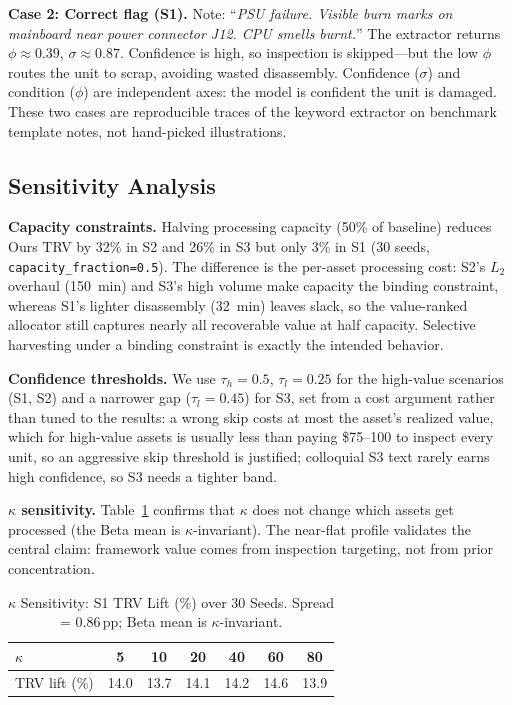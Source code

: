 \documentclass[conference]{IEEEtran}
\begin{document}
\smallskip\noindent\textbf{Case 2: Correct flag (S1).}
Note: ``\textit{PSU failure. Visible burn marks on mainboard near power connector
J12. CPU smells burnt.}'' The extractor returns $\phi{\approx}0.39$,
$\sigma{\approx}0.87$. Confidence is high, so inspection is skipped---but the low
$\phi$ routes the unit to scrap, avoiding wasted disassembly. Confidence
($\sigma$) and condition ($\phi$) are independent axes: the model is confident the
unit is damaged. These two cases are reproducible traces of the keyword extractor
on benchmark template notes, not hand-picked illustrations.

\subsection{Sensitivity Analysis}

\noindent\textbf{Capacity constraints.}
Halving processing capacity (50\% of baseline) reduces Ours TRV by 32\% in S2 and
26\% in S3 but only 3\% in S1 (30 seeds, \texttt{capacity\_fraction=0.5}). The
difference is the per-asset processing cost: S2's $L_2$ overhaul (150~min) and
S3's high volume make capacity the binding constraint, whereas S1's lighter
disassembly (32~min) leaves slack, so the value-ranked allocator still captures
nearly all recoverable value at half capacity. Selective harvesting under a
binding constraint is exactly the intended behavior.

\noindent\textbf{Confidence thresholds.}
We use $\tau_h{=}0.5$, $\tau_l{=}0.25$ for the high-value scenarios (S1, S2) and a
narrower gap ($\tau_l{=}0.45$) for S3, set from a cost argument rather than tuned
to the results: a wrong skip costs at most the asset's realized value, which for
high-value assets is usually less than paying \$75--100 to inspect every unit, so
an aggressive skip threshold is justified; colloquial S3 text rarely earns high
confidence, so S3 needs a tighter band.

\noindent\textbf{$\kappa$ sensitivity.}
Table~\ref{tab:kappa} confirms that $\kappa$ does not change which assets get
processed (the Beta mean is $\kappa$-invariant). The near-flat profile validates
the central claim: framework value comes from inspection targeting, not from
prior concentration.

\begin{table}[!t]
\caption{$\kappa$ Sensitivity: S1 TRV Lift (\%) over 30 Seeds.
  Spread = 0.86\,pp; Beta mean is $\kappa$-invariant.}
\label{tab:kappa}
\centering\small
\begin{tabular}{lcccccc}
\toprule
$\kappa$       & 5    & 10   & 20   & 40   & 60   & 80 \\
\midrule
TRV lift (\%)  & 14.0 & 13.7 & 14.1 & 14.2 & 14.6 & 13.9 \\
\bottomrule
\end{tabular}
\end{table}
\end{document}

